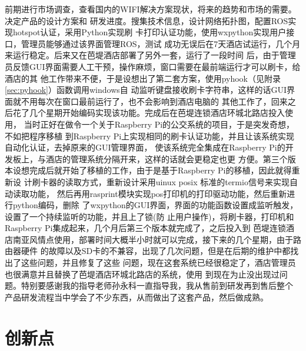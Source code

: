 前期进行市场调查，查看国内的WIFI解决方案现状，将来的趋势和市场的需要。决定产品的设计方案和
研发进度。搜集技术信息，设计网络拓扑图，配置ROS\cite{ros}实现hotspot认证，采用Python实现刷
卡打印认证功能，使用wxpython\cite{wxpython}实现用户接口，管理员能够通过该界面管理ROS，测试
成功无误后在7天酒店试运行，几个月来运行稳定。后来又在芭堤酒店部署了另外一套，运行了一段时间
后，由于管理员反馈GUI界面需要人工干预，操作麻烦，窗口需要在最前端运行才可以刷卡，给酒店的其
他工作带来不便，于是设想出了第二套方案，使用pyhook（见附录\ref{sec:pyhook}）函数调用windows自
动监听键盘接收刷卡字符串，这样的话GUI界面就不用每次在窗口最前运行了，也不会影响到酒店电脑的
其他工作了，回来之后花了几个星期开始编码实现该功能。完成后在芭堤连锁酒店环城北路店投入使用，
当时正好在做令一个关于Raspberry Pi的公交系统的项目，于是突发奇想，不如把程序移植
到Raspberry Pi上实现相同的刷卡认证功能，并且让该系统实现自动化认证，去掉原来的GUI管理界面，
使该系统完全集成在Raspberry Pi的开发板上，与酒店的管理系统分隔开来，这样的话就会更稳定也更
方便。第三个版本设想完成后就开始了移植的工作，由于是基于Raspberry Pi的移植，因此就得重新设
计刷卡器的读取方式，重新设计采用uinux posix 标准的termio\cite{termio}信号来实现自动读取功能，
然后再用rasprint模块实现pos打印机的打印驱动功能，然后重新进行python编码，删除
了wxpython的GUI界面，界面的功能函数设置成监听触发，设置了一个持续监听的功能，并且上了锁(防
止用户操作)，将刷卡器，打印机和Raspberry Pi集成起来，几个月后第三个版本就完成了，之后投入到
芭堤连锁酒店南亚风情点使用，部署时间大概半小时就可以完成，接下来的几个星期，由于路由器硬件
的故障以及SD卡的不兼容，出现了几次问题，但是在后期的维护中都找出了这些问题，并且修复了这些
问题，现在这套系统已经很稳定了，酒店管理员也很满意并且替换了芭堤酒店环城北路店的系统，使用
到现在为止没出现过问题。特别要感谢我的指导老师孙永科一直指导我，我从售前到研发再到售后整个
产品研发流程当中学会了不少东西，从而做出了这套产品，然后做成熟。

\section{创新点}

